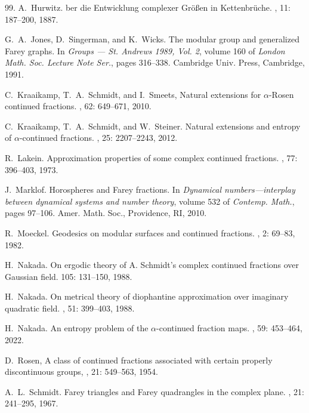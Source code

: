 \documentclass[graybox]{svmult}
\begin{document}
\begin{thebibliography}{99.}
A.~Hurwitz. 
ber die {E}ntwicklung complexer {G}r{\"o}{\ss}en in {K}ettenbr{\"u}che.
, 11: 187--200, 1887.

G.~A.~Jones, D.~Singerman, and K.~Wicks.
\newblock The modular group and generalized {F}arey graphs.
\newblock In {\em Groups --- {S}t. {A}ndrews 1989, {V}ol. 2}, volume 160 of {\em
London Math. Soc. Lecture Note Ser.}, pages 316--338. Cambridge Univ. Press,
Cambridge, 1991.

C.~Kraaikamp, T.~A.~Schmidt, and I.~Smeets,
\newblock Natural extensions for $\alpha$-Rosen continued fractions. 
, 62: 649–671, 2010.

C.~Kraaikamp, T.~A.~Schmidt, and W.~Steiner. 
\newblock Natural extensions and entropy of $\alpha$-continued fractions.
, 25: 2207--2243, 2012.

R.~Lakein.
\newblock Approximation properties of some complex continued fractions.
, 77: 396--403, 1973.

J.~Marklof.
\newblock Horospheres and {F}arey fractions.
\newblock In {\em Dynamical numbers---interplay between dynamical systems and
  number theory}, volume 532 of {\em Contemp. Math.}, pages 97--106. Amer.
  Math. Soc., Providence, RI, 2010.

R.~Moeckel.
\newblock Geodesics on modular surfaces and continued fractions. 
, 2: 69--83, 1982.  


H.~Nakada.
 \newblock On ergodic theory of A. Schmidt's complex continued fractions over Gaussian field. 
  105: 131--150, 1988.
 
H.~Nakada. 
\newblock On metrical theory of diophantine approximation over imaginary quadratic field. 
, 51: 399--403, 1988.

H.~Nakada.
\newblock An entropy problem of the $\alpha$-continued fraction maps. 
, 59: 453--464, 2022. 

D.~Rosen, 
\newblock A class of continued fractions associated with certain properly discontinuous groups, 
,  21: 549–563, 1954.  

A.~L.~Schmidt.
\newblock Farey triangles and {F}arey quadrangles in the complex plane.
, 21: 241--295, 1967.


\end{thebibliography}
\end{document}
